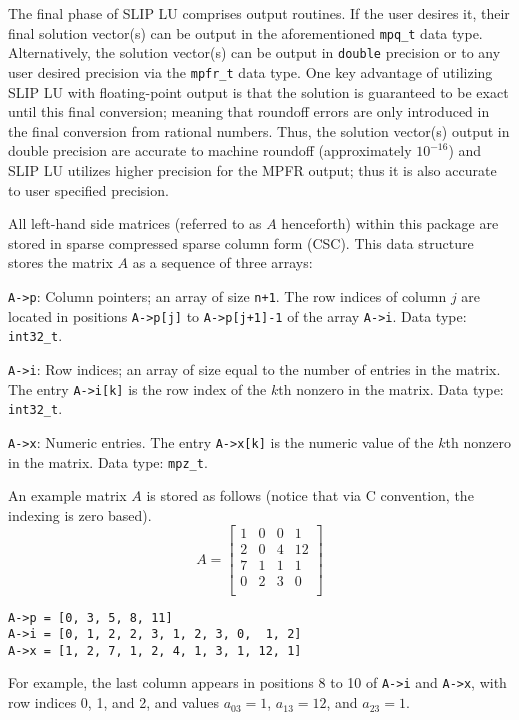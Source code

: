 \documentclass[11pt]{article}
\theoremstyle{definition}
\begin{document}
The final phase of SLIP LU comprises output routines. If the user desires it,
their final solution vector(s) can be output in the aforementioned \verb|mpq_t|
data type. Alternatively, the solution vector(s) can be output in \verb|double|
precision or to any user desired precision via the \verb|mpfr_t| data type. One
key advantage of utilizing SLIP LU with floating-point output is that the
solution is guaranteed to be exact until this final conversion; meaning that
roundoff errors are only introduced in the final conversion from rational
numbers. Thus, the solution vector(s) output in double precision are accurate
to machine roundoff (approximately $10^{-16}$) and SLIP LU utilizes higher
precision for the MPFR output; thus it is also accurate to user specified
precision.

All left-hand side matrices (referred to as $A$ henceforth) within this package
are stored in sparse compressed sparse column form (CSC). This data structure
stores the matrix $A$ as a sequence of three arrays:

\verb|A->p|: Column pointers; an array of size \verb|n+1|. The row indices of
column $j$ are located in positions \verb|A->p[j]| to \verb|A->p[j+1]-1| of the
array \verb|A->i|. Data type: \verb|int32_t|.

\verb|A->i|: Row indices; an array of size equal to the number of entries in
the matrix. The entry \verb|A->i[k]| is the row index of the $k$th nonzero in
the matrix. Data type: \verb|int32_t|.

\verb|A->x|: Numeric entries. The entry \verb|A->x[k]| is the numeric value of
the $k$th nonzero in the matrix. Data type: \verb|mpz_t|.

An example matrix $A$ is stored as follows (notice that via C convention, the
indexing is zero based).
\[
A = \begin{bmatrix}
1 & 0 & 0 & 1 \\
2 & 0 & 4 & 12 \\
7 & 1 & 1 & 1 \\
0 & 2 & 3 & 0 \\
\end{bmatrix}
\]

{\small
\noindent \verb|A->p = [0, 3, 5, 8, 11]| \\
\verb|A->i = [0, 1, 2, 2, 3, 1, 2, 3, 0,  1, 2]| \\
\verb|A->x = [1, 2, 7, 1, 2, 4, 1, 3, 1, 12, 1]|
}

For example, the last column appears in positions 8
to 10 of \verb|A->i| and \verb|A->x|, with row indices 0, 1, and 2, and values
$a_{03}=1$, $a_{13}=12$, and $a_{23}=1$.
\end{document}

